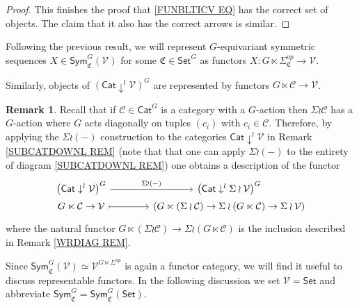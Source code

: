 \documentclass[a4paper,10pt
,draft
]{article}%
\numberwithin{equation}{section}
\numberwithin{figure}{section}
\theoremstyle{definition} %
\newtheorem{remark}[equation]{Remark}%
\newcommand{\V}{\ensuremath{\mathcal V}}
\newcommand{\1}{\ensuremath{\mathbbm 1}}%
\begin{document}
\begin{proof}
This finishes the proof that \eqref{FUNBLTICV EQ} has the correct set of objects. The claim that it also has the correct arrows is similar.
\end{proof}



Following the previous result, 
we will represent $G$-equivariant symmetric sequences
$X \in \mathsf{Sym}^G_{\mathfrak{C}}(\mathcal{V})$
for some $\mathfrak{C} \in \mathsf{Set}^G$
as functors
$X \colon G \ltimes \Sigma_{\mathfrak{C}}^{op} \to \mathcal{V}$.

Similarly, objects of
$\left( \mathsf{Cat} \downarrow^{l} \mathcal{V} \right)^G$
are represented by functors $G \ltimes \mathcal{C} \to \V$.


\begin{remark}\label{RHOPURP REM}
Recall that if $\mathcal{C}\in \mathsf{Cat}^G$
is a category with a $G$-action then 
$\Sigma \wr \mathcal{C}$
has a $G$-action where $G$ acts diagonally on tuples $(c_i)$ with $c_i \in \mathcal{C}$.
Therefore, by applying the 
$\Sigma \wr (-)$
construction to the categories
$\mathsf{Cat} \downarrow^l \V$
in Remark \ref{SUBCATDOWNL REM}
(note that that one can apply $\Sigma \wr (-)$
to the entirety of diagram \eqref{SUBCATDOWNL REM})
one obtains a description of the functor
\begin{equation}\label{RHOPURP EQ}
\begin{tikzcd}[column sep =40,row sep =0]
	\left( \mathsf{Cat} \downarrow^{l} \mathcal{V} \right)^G
	\ar{r}{\Sigma \wr (-) } &
	\left( \mathsf{Cat} \downarrow^{l} \Sigma \wr \mathcal{V} \right)^G
\\
	G \ltimes \mathcal{C} \to \mathcal{V} \ar[mapsto]{r} &
	\left(G \ltimes (\Sigma \wr \mathcal{C}) \to 
	\Sigma \wr (G \ltimes  \mathcal{C}) \to \Sigma \wr \mathcal{V}\right)
\end{tikzcd}
\end{equation}
where the natural functor
$G \ltimes (\Sigma \wr \mathcal{C}) \to 
\Sigma \wr (G \ltimes  \mathcal{C})$
is the inclusion described in Remark \ref{WRDIAG REM}.
\end{remark}


Since  
$\mathsf{Sym}^G_{\mathfrak{C}}(\mathcal{V}) \simeq 
\V^{G \ltimes \Sigma^{op}}$ is again a functor category, 
we will find it useful to discuss representable functors.
In the following discussion 
we set $\V = \mathsf{Set}$ and abbreviate
$\mathsf{Sym}^G_{\mathfrak{C}} = \mathsf{Sym}^G_{\mathfrak{C}}(\mathsf{Set})$.
\end{document}

